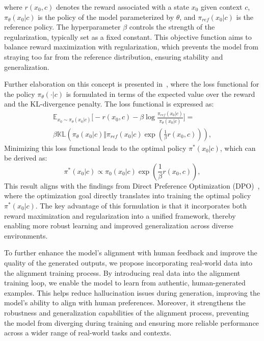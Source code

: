 where \( r(x_0, c) \) denotes the reward associated with a state \( x_0 \) given context \( c \), \( \pi_\theta(x_0|c) \) is the policy of the model parameterized by \( \theta \), and \( \pi_{ref}(x_0|c) \) is the reference policy. The hyperparameter \( \beta \) controls the strength of the regularization, typically set as a fixed constant. This objective function aims to balance reward maximization with regularization, which prevents the model from straying too far from the reference distribution, ensuring stability and generalization.

Further elaboration on this concept is presented in~\cite{zhang_2023_ltbook}, where the loss functional for the policy \( \pi_\theta(\cdot|c) \) is formulated in terms of the expected value over the reward and the KL-divergence penalty. The loss functional is expressed as:
\small
\begin{multline}
\mathbb{E}_{x_0 \sim \pi_\theta(x_0|c)} \Big[ -r(x_0, c) - \beta \log \frac{\pi_{ref}(x_0|c)}{\pi_\theta(x_0|c)} \Big] = \\
\beta \mathbb{KL} \left( \pi_\theta(x_0|c) \Big\Vert \pi_{ref}(x_0|c) \exp \left( \frac{1}{\beta} r(x_0, c) \right) \right),
\end{multline}
\normalsize
Minimizing this loss functional leads to the optimal policy \( \pi^*(x_0|c) \), which can be derived as:
\small
\begin{equation}
\pi^*(x_0|c) \propto \pi_0(x_0|c) \exp \left( \frac{1}{\beta} r(x_0, c) \right),
\end{equation}
\normalsize
This result aligns with the findings from Direct Preference Optimization (DPO)~\cite{rafailov2024directpreferenceoptimizationlanguage}, where the optimization goal directly translates into training the optimal policy \( \pi^*(x_0|c) \). The key advantage of this formulation is that it incorporates both reward maximization and regularization into a unified framework, thereby enabling more robust learning and improved generalization across diverse environments.

To further enhance the model's alignment with human feedback and improve the quality of the generated outputs, we propose incorporating real-world data into the alignment training process. By introducing real data into the alignment training loop, we enable the model to learn from authentic, human-generated examples. This helps reduce hallucination issues during generation, improving the model's ability to align with human preferences. Moreover, it strengthens the robustness and generalization capabilities of the alignment process, preventing the model from diverging during training and ensuring more reliable performance across a wider range of real-world tasks and contexts.

